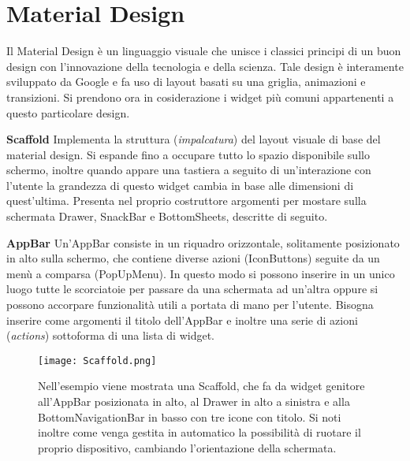 	\section{Material Design}
	Il Material Design è un linguaggio visuale che unisce i classici principi di
	un buon design con l'innovazione della tecnologia e della scienza. 
	\cite{material} \newline
	Tale design è interamente sviluppato da Google e fa uso di layout basati su
	una griglia, animazioni e transizioni. Si prendono ora in cosiderazione i
	widget più comuni appartenenti a questo particolare design.
	\begin{trivlist}
		\item \textbf{Scaffold} \newline
		Implementa la struttura (\textit{impalcatura}) del layout visuale di
		base del material design. Si espande fino a occupare tutto lo spazio
		disponibile sullo schermo, inoltre quando appare una tastiera a seguito
		di un'interazione con l'utente la grandezza di questo widget cambia in
		base alle dimensioni di quest'ultima. Presenta nel proprio costruttore
		argomenti per mostare sulla schermata Drawer, SnackBar e BottomSheets,
		descritte di seguito. 
		\item \textbf{AppBar} \newline
		Un'AppBar consiste in un riquadro orizzontale, solitamente posizionato in
		alto sulla schermo, che contiene diverse azioni (IconButtons) seguite da
		un menù a comparsa (PopUpMenu). In questo modo si possono inserire in un
		unico luogo tutte le scorciatoie per passare da una schermata ad
		un'altra oppure si possono accorpare funzionalità utili a portata di
		mano per l'utente. Bisogna inserire come argomenti il titolo dell'AppBar
		e inoltre una serie di azioni (\textit{actions}) sottoforma di una lista
		di widget. 
		\begin{figure}
			\centering
			\texttt{[image: Scaffold.png]}			
			\caption{Nell'esempio viene mostrata una Scaffold, che fa da widget
			genitore all'AppBar posizionata in alto, al Drawer in alto a
			sinistra e alla BottomNavigationBar in basso con tre icone con
			titolo. Si noti inoltre come venga gestita in automatico la
			possibilità di ruotare il proprio dispositivo, cambiando
			l'orientazione della schermata.}
		\end{figure}

\end{trivlist}
